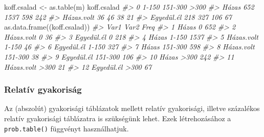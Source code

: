 \documentclass[
]{book}
\newenvironment{Shaded}{\begin{snugshade}}{\end{snugshade}}
\newcommand{\CommentTok}[1]{\textcolor[rgb]{0.56,0.35,0.01}{\textit{#1}}}
\newcommand{\DecValTok}[1]{\textcolor[rgb]{0.00,0.00,0.81}{#1}}
\newcommand{\FunctionTok}[1]{\textcolor[rgb]{0.00,0.00,0.00}{#1}}
\newcommand{\NormalTok}[1]{#1}
\newcommand{\OtherTok}[1]{\textcolor[rgb]{0.56,0.35,0.01}{#1}}
\newcommand{\SpecialCharTok}[1]{\textcolor[rgb]{0.00,0.00,0.00}{#1}}
\begin{document}
\begin{Shaded}
\begin{Highlighting}[]
\NormalTok{koff.csalad }\OtherTok{\textless{}{-}} \FunctionTok{as.table}\NormalTok{(m)}
\NormalTok{koff.csalad}
\CommentTok{\#\textgreater{}               0 1{-}150 151{-}300 \textgreater{}300}
\CommentTok{\#\textgreater{} Házas       652  1537     598  242}
\CommentTok{\#\textgreater{} Házas.volt   36    46      38   21}
\CommentTok{\#\textgreater{} Egyedül.él  218   327     106   67}
\FunctionTok{as.data.frame}\NormalTok{((koff.csalad))}
\CommentTok{\#\textgreater{}          Var1    Var2 Freq}
\CommentTok{\#\textgreater{} 1       Házas       0  652}
\CommentTok{\#\textgreater{} 2  Házas.volt       0   36}
\CommentTok{\#\textgreater{} 3  Egyedül.él       0  218}
\CommentTok{\#\textgreater{} 4       Házas   1{-}150 1537}
\CommentTok{\#\textgreater{} 5  Házas.volt   1{-}150   46}
\CommentTok{\#\textgreater{} 6  Egyedül.él   1{-}150  327}
\CommentTok{\#\textgreater{} 7       Házas 151{-}300  598}
\CommentTok{\#\textgreater{} 8  Házas.volt 151{-}300   38}
\CommentTok{\#\textgreater{} 9  Egyedül.él 151{-}300  106}
\CommentTok{\#\textgreater{} 10      Házas    \textgreater{}300  242}
\CommentTok{\#\textgreater{} 11 Házas.volt    \textgreater{}300   21}
\CommentTok{\#\textgreater{} 12 Egyedül.él    \textgreater{}300   67}
\end{Highlighting}
\end{Shaded}

\hypertarget{relatuxedv-gyakorisuxe1g}{%
\subsubsection{Relatív gyakoriság}\label{relatuxedv-gyakorisuxe1g}}

Az (abszolút) gyakorisági táblázatok mellett relatív gyakorisági, illetve százalékos relatív gyakorisági táblázatra is szükségünk lehet. Ezek létrehozásához a \texttt{prob.table()} függvényt használhatjuk.

\begin{Shaded}
\end{Shaded}
\end{document}
